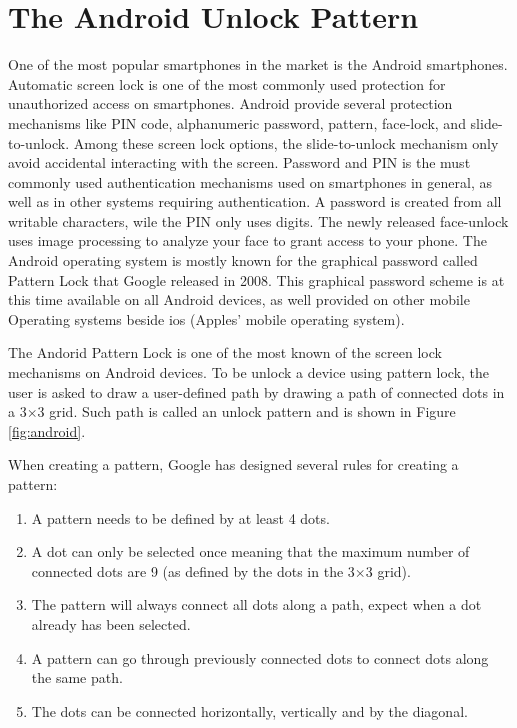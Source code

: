 \section{The Android Unlock Pattern}\label{sec:alp}

	One of the most popular smartphones in the market is the Android smartphones. Automatic screen lock is one of the most commonly used protection for unauthorized access on smartphones. Android provide several protection mechanisms like PIN code, alphanumeric password, pattern, face-lock, and slide-to-unlock. Among these screen lock options, the slide-to-unlock mechanism only avoid accidental interacting with the screen. Password and PIN is the must commonly used authentication mechanisms used on smartphones in general, as well as in other systems requiring authentication. A password is created from all writable characters, wile the PIN only uses digits. The newly released face-unlock uses image processing to analyze your face to grant access to your phone. The Android operating system is mostly known for the graphical password called Pattern Lock that Google released in 2008. This graphical password scheme is at this time available on all Android devices, as well provided on other mobile Operating systems beside ios (Apples' mobile operating system).

  The Andorid Pattern Lock is one of the most known of the screen lock mechanisms on Android devices. To be unlock a device using pattern lock, the user is asked to draw a user-defined path by drawing a path of connected dots in a 3$\times$3 grid. Such path is called an unlock pattern and is shown in Figure \ref{fig:android}.

  When creating a pattern, Google has designed several rules for creating a pattern:
  \begin{enumerate}
    \item A pattern needs to be defined by at least 4 dots.
    \item A dot can only be selected once meaning that the maximum number of connected dots are 9 (as defined by the dots in the 3$\times$3 grid).
    \item The pattern will always connect all dots along a path, expect when a dot already has been selected. 
    \item A pattern can go through previously connected dots to connect dots along the same path.
    \item The dots can be connected horizontally, vertically and by the diagonal.
  \end{enumerate}


